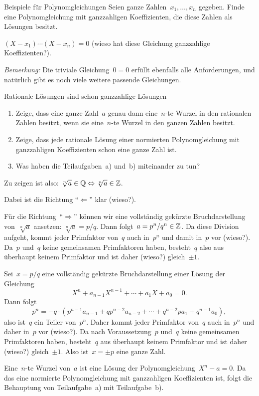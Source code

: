 \documentclass{algblatt}
\begin{document}
\ifloesungen\newpage\fi
\begin{aufgabe}{Beispiele für Polynomgleichungen}
Seien ganze Zahlen~$x_1, \ldots, x_n$ gegeben. Finde eine Polynomgleichung mit
ganzzahligen Koeffizienten, die diese Zahlen als Lösungen besitzt.
\begin{loesung}$(X-x_1) \cdots (X-x_n) = 0$ (wieso hat diese Gleichung
ganzzahlige Koeffizienten?).

\emph{Bemerkung:} Die triviale Gleichung~$0 = 0$ erfüllt ebenfalls alle
Anforderungen, und natürlich gibt es noch viele weitere passende Gleichungen.
\end{loesung}
\end{aufgabe}

\begin{aufgabe}{Rationale Lösungen sind schon ganzzahlige Lösungen}
\begin{enumerate}
  \item Zeige, dass eine ganze Zahl~$a$ genau dann eine~$n$-te Wurzel in den
  rationalen Zahlen besitzt, wenn sie eine~$n$-te Wurzel in den ganzen Zahlen
  besitzt.
  \item Zeige, dass jede rationale Lösung einer normierten Polynomgleichung mit
  ganzzahligen Koeffizienten schon eine ganze Zahl ist.
  \item Was haben die Teilaufgaben~a) und~b) miteinander zu tun?
\end{enumerate}
\begin{loesungE}
\item Zu zeigen ist also: $\sqrt[n]{a} \in \mathbb{Q} \Leftrightarrow \sqrt[n]{a} \in
\mathbb{Z}$.

Dabei ist die Richtung "`$\Leftarrow$"' klar (wieso?).

Für die
Richtung~"`$\Rightarrow$"' können wir eine vollständig gekürzte
Bruchdarstellung von~$\sqrt[n]{a}$ ansetzen: $\sqrt[n]{a} = p/q$.
Dann folgt~$a = p^n / q^n \in \mathbb{Z}$. Da diese Division aufgeht, kommt jeder
Primfaktor von~$q$ auch in~$p^n$ und damit in~$p$ vor (wieso?). Da~$p$ und~$q$ keine
gemeinsamen Primfaktoren haben, besteht~$q$ also aus überhaupt keinem
Primfaktor und ist daher (wieso?) gleich~$\pm 1$.
\item Sei~$x = p/q$ eine vollständig gekürzte Bruchdarstellung einer Lösung der
Gleichung
\[ X^n + a_{n-1} X^{n-1} + \cdots + a_1 X + a_0 = 0. \]
Dann folgt
\[ p^n = -q \cdot (p^{n-1} a_{n-1} + q p^{n-2} a_{n-2} + \cdots + q^{n-2} p
a_1 + q^{n-1} a_0), \]
also ist~$q$ ein Teiler von~$p^n$. Daher kommt jeder Primfaktor von~$q$ auch
in~$p^n$ und daher in~$p$ vor (wieso?). Da nach Voraussetzung~$p$ und~$q$ keine
gemeinsamen Primfaktoren haben, besteht~$q$ aus überhaupt keinem Primfaktor und
ist daher (wieso?) gleich~$\pm1$. Also ist~$x = \pm p$ eine ganze Zahl.
\item Eine~$n$-te Wurzel von~$a$ ist eine Lösung der Polynomgleichung~$X^n - a
= 0$. Da das eine normierte Polynomgleichung mit ganzzahligen Koeffizienten
ist, folgt die Behauptung von Teilaufgabe~a) mit Teilaufgabe~b).
\end{loesungE}
\end{aufgabe}
\end{document}
